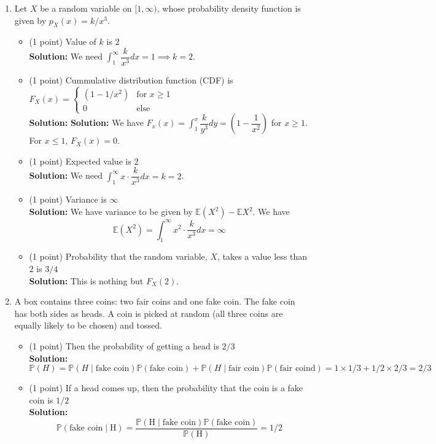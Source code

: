 \documentclass[11pt]{article}
\newcommand{\bkt}[1]{\left( #1\right)}
\newcommand{\dint}{\displaystyle\int}
\newcommand{\Eb}{\mathbb{E}}
\newcommand{\Pb}{\mathbb{P}}
\newcommand{\point}{(1 point) }
\newcommand{\fillans}[1]{\hfill$\boxed{#1}$}
\newcommand{\soln}[1]{\textbf{Solution:} #1}
\begin{document}
\singlespacing
\begin{enumerate}
	\item
	Let $X$ be a random variable on $[1,\infty)$, whose probability density function is given by $p_X(x) = k/x^3$.
	\begin{itemize}
		\item
		\point Value of $k$ is \fillans{2}\\
		\soln{We need $\dint_1^{\infty}\dfrac{k}{x^3}dx = 1 \implies k=2$.}
		\item
		\point Cummulative distribution function (CDF) is \fillans{F_X(x) = \begin{cases}\bkt{1-1/x^2} & \text{for } x \geq 1\\
		0 & \text{else}
		\end{cases}}\\
		\soln{
		\soln{We have $F_x(x) = \dint_1^x \dfrac{k}{y^3}dy = \bkt{1-\dfrac1{x^2}}$ for $x \geq 1$. For $x \leq 1$, $F_X(x) = 0$.}
		}
		\item
		\point Expected value is \fillans{2}\\
		\soln{
		We need $\dint_1^{\infty}x \cdot \dfrac{k}{x^3}dx = k = 2$.
		}
		\item
		\point Variance is \fillans{\infty}\\
		\soln{
		We have variance to be given by $\Eb\bkt{X^2} - \Eb{X}^2$. We have
		$$\Eb\bkt{X^2} = \dint_1^{\infty}x^2 \cdot \dfrac{k}{x^3}dx = \infty$$
		}
		\item
		\point Probability that the random variable, $X$, takes a value less than $2$ is \fillans{3/4}\\
		\soln{
		This is nothing but $F_X(2)$.
		}
	\end{itemize}
	\item
	A box contains three coins: two fair coins and one fake coin. The fake coin has both sides as heads. A coin is picked at random (all three coins are equally likely to be chosen) and tossed.
	\begin{itemize}
		\item
		\point Then the probability of getting a head is \fillans{2/3}\\
		\soln{
		$$\Pb\bkt{H} = \Pb\bkt{H \mid \text{fake coin}} \Pb\bkt{\text{fake coin}}+ \Pb\bkt{H \mid \text{fair coin}} \Pb\bkt{\text{fair coind}} = 1 \times 1/3 + 1/2 \times 2/3 = 2/3$$
		}
		\item
		\point If a head comes up, then the probability that the coin is a fake coin is \fillans{1/2}\\
		\soln{
		$$\Pb\bkt{\text{fake coin} \mid \text{H}} = \dfrac{\Pb\bkt{\text{H} \mid \text{fake coin}} \Pb\bkt{\text{fake coin}}}{\Pb\bkt{\text{H}}} =1/2$$
}
\end{itemize}
\end{enumerate}
\end{document}
